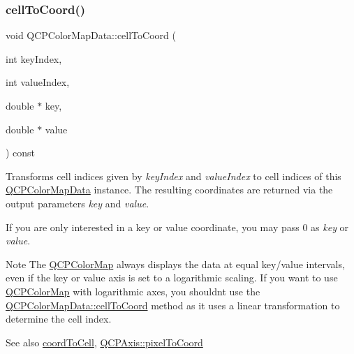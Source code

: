\mbox{\label{class_q_c_p_color_map_data_af1a36385c78ab624cd617065602408b6}} 
\subsubsection{\texorpdfstring{cellToCoord()}{cellToCoord()}}
{\footnotesize\ttfamily void Q\+C\+P\+Color\+Map\+Data\+::cell\+To\+Coord (\begin{DoxyParamCaption}\item[{int}]{key\+Index,  }\item[{int}]{value\+Index,  }\item[{double $\ast$}]{key,  }\item[{double $\ast$}]{value }\end{DoxyParamCaption}) const}

Transforms cell indices given by {\itshape key\+Index} and {\itshape value\+Index} to cell indices of this \mbox{\hyperlink{class_q_c_p_color_map_data}{Q\+C\+P\+Color\+Map\+Data}} instance. The resulting coordinates are returned via the output parameters {\itshape key} and {\itshape value}.

If you are only interested in a key or value coordinate, you may pass 0 as {\itshape key} or {\itshape value}.

\begin{DoxyNote}{Note}
The \mbox{\hyperlink{class_q_c_p_color_map}{Q\+C\+P\+Color\+Map}} always displays the data at equal key/value intervals, even if the key or value axis is set to a logarithmic scaling. If you want to use \mbox{\hyperlink{class_q_c_p_color_map}{Q\+C\+P\+Color\+Map}} with logarithmic axes, you shouldn\textquotesingle{}t use the \mbox{\hyperlink{class_q_c_p_color_map_data_af1a36385c78ab624cd617065602408b6}{Q\+C\+P\+Color\+Map\+Data\+::cell\+To\+Coord}} method as it uses a linear transformation to determine the cell index.
\end{DoxyNote}
\begin{DoxySeeAlso}{See also}
\mbox{\hyperlink{class_q_c_p_color_map_data_aca5b29e0ca2f299c9060fc6e1f74d0c8}{coord\+To\+Cell}}, \mbox{\hyperlink{class_q_c_p_axis_a536ef8f624cac59b6b6fdcb495723c57}{Q\+C\+P\+Axis\+::pixel\+To\+Coord}} 
\end{DoxySeeAlso}
\mbox{\label{class_q_c_p_color_map_data_a9910ba830e96955bd5c8e5bef1e77ef3}} 
